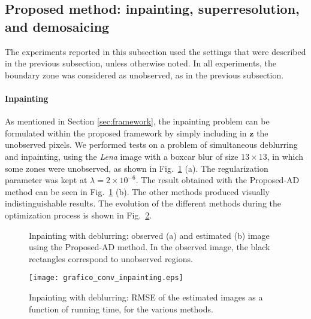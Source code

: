 \documentclass[10pt,twocolumn,twoside]{IEEEtran}
\newcommand{\z}{\mathbf{z}} %
\begin{document}
\subsection{Proposed method: inpainting, superresolution, and demosaicing} \label{sec:exp_app}

The experiments reported in this subsection used the settings that were described in the previous subsection, unless otherwise noted. In all experiments, the boundary zone was considered as unobserved, as in the previous subsection.

\paragraph{Inpainting}

As mentioned in Section \ref{sec:framework}, the inpainting problem can be formulated within the proposed framework by simply including in $\z$ the unobserved pixels. We performed tests on a problem of simultaneous deblurring and inpainting, using the \emph{Lena} image with a boxcar blur of size $13 \times 13$, in which some zones were unobserved, as shown in Fig.~\ref{fig:lena_inpainting} (a). The regularization parameter was kept at $\lambda = 2 \times 10^{-6}$. The result obtained with the Proposed-AD method can be seen in Fig.~\ref{fig:lena_inpainting} (b). The other methods produced visually indistinguishable results. The evolution of the different methods during the optimization process is shown in Fig.~\ref{fig:grafico_conv_inpainting}.

\begin{figure}[!t]
	\centering
	\hfil
	\caption{Inpainting with deblurring: observed (a) and estimated (b) image using the Proposed-AD method. In the observed image, the black rectangles correspond to unobserved regions.}
	\label{fig:lena_inpainting}
\end{figure}

\begin{figure}[!t]
	\centering
	\texttt{[image: grafico\_conv\_inpainting.eps]}%
	\caption{Inpainting with deblurring: RMSE of the estimated images as a function of running time, for the various methods.}	
	\label{fig:grafico_conv_inpainting}
\end{figure}
\end{document}
